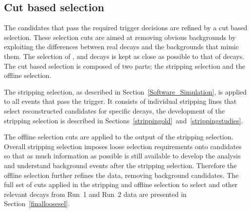 
\subsection{Cut based selection}
\label{sec:cutbasedsel}
The \bmumu candidates that pass the required trigger decisions are refined by a cut based selection. These selection cuts are aimed at removing obvious backgrounds by exploiting the differences between real \bmumu decays and the backgrounds that mimic them. The selection of \bhh, \bujpsik and \bsjpisphi decays is kept as close as possible to that of \bmumu decays. The cut based selection is composed of two parts; the stripping selection and the offline selection. 

The stripping selection, as described in Section~\ref{Software_Simulation}, is applied to all events that pass the trigger. It consists of individual stripping lines that select reconstructed candidates for specific decays, the development of the stripping selection is described in Sections~\ref{strippingold}~and~\ref{strippingstudies}.%




The offline selection cuts are applied to the output of the stripping selection. Overall stripping selection imposes loose selection requirements onto \bmumu candidates so that as much information as possible is still available to develop the analysis and understand background events after the stripping selection. Therefore the offline selection further refines the data, removing background candidates. The full set of cuts applied in the stripping and offline selection to select \bmumu and other relevant decays from Run~1 and Run~2 data are presented in Section~\ref{finalloosesel}. 


